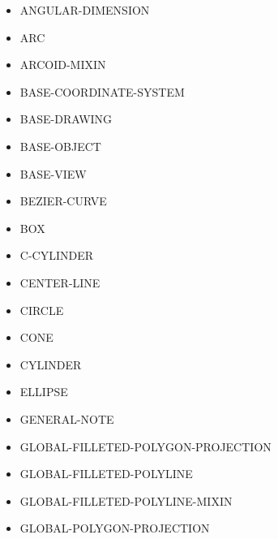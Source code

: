 \documentclass [11pt]{book}
\begin{document}
\label{subsec:objectdefinitions}



\begin{itemize}

\item {}ANGULAR-DIMENSION

\item {}ARC

\item {}ARCOID-MIXIN

\item {}BASE-COORDINATE-SYSTEM

\item {}BASE-DRAWING

\item {}BASE-OBJECT

\item {}BASE-VIEW

\item {}BEZIER-CURVE

\item {}BOX

\item {}C-CYLINDER

\item {}CENTER-LINE

\item {}CIRCLE

\item {}CONE

\item {}CYLINDER

\item {}ELLIPSE

\item {}GENERAL-NOTE

\item {}GLOBAL-FILLETED-POLYGON-PROJECTION

\item {}GLOBAL-FILLETED-POLYLINE

\item {}GLOBAL-FILLETED-POLYLINE-MIXIN

\item {}GLOBAL-POLYGON-PROJECTION


\end{itemize}
\end{document}

